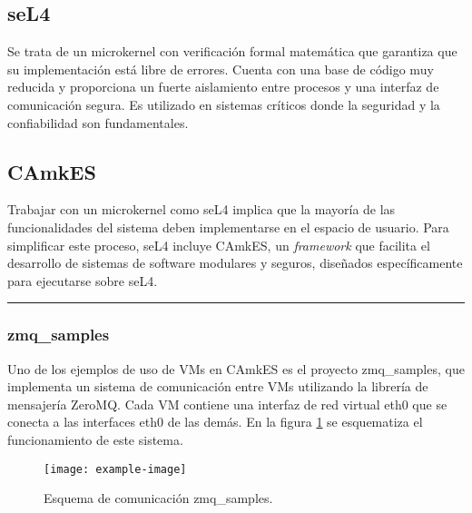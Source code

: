 \subsection{seL4}
Se trata de un microkernel con verificación formal matemática que garantiza que su implementación está libre de errores. Cuenta con una base de código muy reducida y proporciona un fuerte aislamiento entre procesos y una interfaz de comunicación segura. Es utilizado en sistemas críticos donde la seguridad y la confiabilidad son fundamentales. 

\subsection{CAmkES}
Trabajar con un microkernel como seL4 implica que la mayoría de las funcionalidades del sistema deben implementarse en el espacio de usuario. Para simplificar este proceso, seL4 incluye CAmkES, un \textit{framework} que facilita el desarrollo de sistemas de software modulares y seguros, diseñados específicamente para ejecutarse sobre seL4.





\noindent\rule{\textwidth}{0.4pt}

\subsubsection{zmq\_samples}
Uno de los ejemplos de uso de VMs en CAmkES es el proyecto zmq\_samples, que implementa un sistema de comunicación entre VMs utilizando la librería de mensajería ZeroMQ. Cada VM contiene una interfaz de red virtual eth0 que se conecta a las interfaces eth0 de las demás. En la figura \ref{diag:zmq_samples} se esquematiza el funcionamiento de este sistema.


\begin{figure}[h!]
    \centering
    \texttt{[image: example-image]}
    \caption{Esquema de comunicación zmq\_samples.}
    \label{diag:zmq_samples}
\end{figure}


